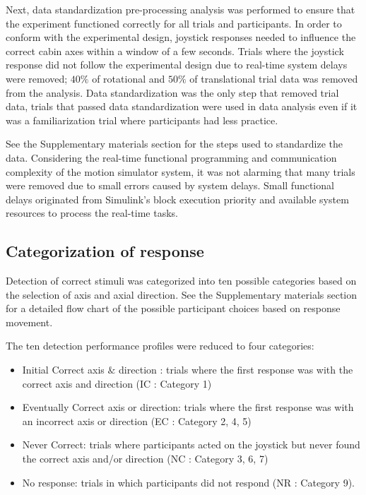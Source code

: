 \documentclass[11pt, onecolumn]{article}
\begin{document}
Next, data standardization pre-processing analysis was performed to ensure that the experiment functioned correctly for all trials and participants.  In order to conform with the experimental design, joystick responses needed to influence the correct cabin axes within a window of a few seconds.  Trials where the joystick response did not follow the experimental design due to real-time system delays were removed; $40\%$ of rotational and $50\%$ of translational trial data was removed from the analysis.  Data standardization was the only step that removed trial data, trials that passed data standardization were used in data analysis even if it was a familiarization trial where participants had less practice.

See the Supplementary materials section for the steps used to standardize the data.  Considering the real-time functional programming and communication complexity of the motion simulator system, it was not alarming that many trials were removed due to small errors caused by system delays.  Small functional delays originated from Simulink's block execution priority and available system resources to process the real-time tasks.

\subsection{Categorization of response}
Detection of correct stimuli was categorized into ten possible categories based on the selection of axis and axial direction.  See the Supplementary materials section for a detailed flow chart of the possible participant choices based on response movement.

The ten detection performance profiles were reduced to four categories: 
\begin{itemize}
\item Initial Correct axis $\&$ direction : trials where the first response was with the correct axis and direction (IC : Category 1)
\item Eventually Correct axis or direction: trials where the first response was with an incorrect axis or direction  (EC : Category 2, 4, 5)
\item Never Correct: trials where participants acted on the joystick but never found the correct axis and/or direction (NC : Category 3, 6, 7)
\item No response: trials in which participants did not respond (NR : Category 9).
\end{itemize}
\end{document}
